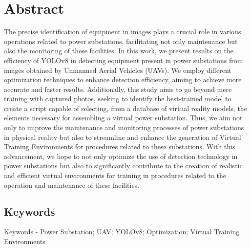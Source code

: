 \newpage
\thispagestyle{empty}
\chapter*{Abstract}
\vspace{-35pt}

The precise identification of equipment in images plays a crucial role in various operations related to power substations, facilitating not only maintenance but also the monitoring of these facilities. In this work, we present results on the efficiency of YOLOv8 in detecting equipment present in power substations from images obtained by Unmanned Aerial Vehicles (UAVs). We employ different optimization techniques to enhance detection efficiency, aiming to achieve more accurate and faster results. Additionally, this study aims to go beyond mere training with captured photos, seeking to identify the best-trained model to create a script capable of selecting, from a database of virtual reality models, the elements necessary for assembling a virtual power substation. Thus, we aim not only to improve the maintenance and monitoring processes of power substations in physical reality but also to streamline and enhance the generation of Virtual Training Environments for procedures related to these substations. With this advancement, we hope to not only optimize the use of detection technology in power substations but also to significantly contribute to the creation of realistic and efficient virtual environments for training in procedures related to the operation and maintenance of these facilities.
\section*{Keywords}
Keywords - Power Substation; UAV; YOLOv8; Optimization; Virtual Training Environments

